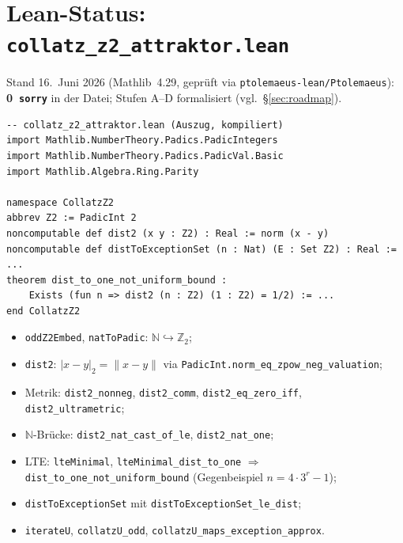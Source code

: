 \documentclass[12pt,a4paper]{article}
\newcommand{\N}{\mathbb{N}}
\newcommand{\Ztwo}{\mathbb{Z}_2}
\begin{document}
\section{Lean-Status: \texttt{collatz\_z2\_attraktor.lean}}
\label{sec:lean}

Stand 16.\ Juni 2026 (Mathlib~4.29, gepr\"uft via \texttt{ptolemaeus-lean/Ptolemaeus}):
\textbf{0~\texttt{sorry}} in der Datei; Stufen A--D formalisiert (vgl.\ \S\ref{sec:roadmap}).

\begin{lstlisting}
-- collatz_z2_attraktor.lean (Auszug, kompiliert)
import Mathlib.NumberTheory.Padics.PadicIntegers
import Mathlib.NumberTheory.Padics.PadicVal.Basic
import Mathlib.Algebra.Ring.Parity

namespace CollatzZ2
abbrev Z2 := PadicInt 2
noncomputable def dist2 (x y : Z2) : Real := norm (x - y)
noncomputable def distToExceptionSet (n : Nat) (E : Set Z2) : Real := ...
theorem dist_to_one_not_uniform_bound :
    Exists (fun n => dist2 (n : Z2) (1 : Z2) = 1/2) := ...
end CollatzZ2
\end{lstlisting}

\begin{tcolorbox}[bewiesen,title={Formalisiert (ohne \texttt{sorry})}]
\begin{itemize}[nosep]
  \item \texttt{oddZ2Embed}, \texttt{natToPadic}: $\N\hookrightarrow\Ztwo$;
  \item \texttt{dist2}: $|x-y|_2=\|x-y\|$ via \texttt{PadicInt.norm\_eq\_zpow\_neg\_valuation};
  \item Metrik: \texttt{dist2\_nonneg}, \texttt{dist2\_comm}, \texttt{dist2\_eq\_zero\_iff},
    \texttt{dist2\_ultrametric};
  \item $\N$-Br\"ucke: \texttt{dist2\_nat\_cast\_of\_le}, \texttt{dist2\_nat\_one};
  \item LTE: \texttt{lteMinimal}, \texttt{lteMinimal\_dist\_to\_one} $\Rightarrow$
    \texttt{dist\_to\_one\_not\_uniform\_bound} (Gegenbeispiel $n=4\cdot3^r-1$);
  \item \texttt{distToExceptionSet} mit \texttt{distToExceptionSet\_le\_dist};
  \item \texttt{iterateU}, \texttt{collatzU\_odd}, \texttt{collatzU\_maps\_exception\_approx}.
\end{itemize}
\end{tcolorbox}
\end{document}
